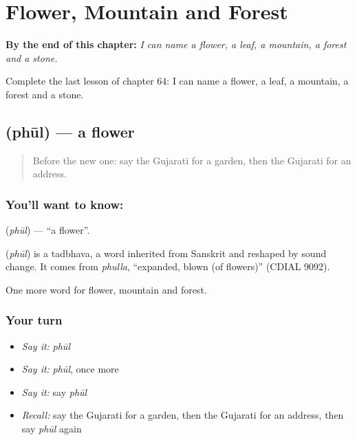 
\chapter{Flower, Mountain and Forest}
\label{ch:gu-flower-mountain-and-forest}

\begin{chapteropening}
\textbf{By the end of this chapter:} \emph{I can name a flower, a leaf, a mountain, a forest and a stone.}

Complete the last lesson of chapter 64: I can name a flower, a leaf, a mountain, a forest and a stone.
\end{chapteropening}

\section[\texorpdfstring{\gu{ફૂલ} (phūl)}{ફૂલ (phūl)}]{ (phūl) — a flower}

\label{lesson:GU-C64-flower}



\begin{quote}
Before the new one: say the Gujarati for a garden, then the Gujarati for an address.
\end{quote}

\subsection*{You'll want to know: }
\textbf{} (\emph{phūl}) — \textquotedblleft{}a flower\textquotedblright{}.

\begin{cousinweb}
\textbf{} (\emph{phūl}) is a tadbhava, a word inherited from Sanskrit and reshaped by sound change. It comes from \emph{phulla}, \textquotedblleft{}expanded, blown (of flowers)\textquotedblright{} (CDIAL 9092).
\end{cousinweb}

\begin{grammarlens}[title={What you've built}]
One more word for flower, mountain and forest.
\end{grammarlens}

\subsection*{Your turn}
\begin{itemize}
\raggedright
  \item \emph{Say it:} \emph{phūl}
  \item \emph{Say it:} \emph{phūl}, once more
  \item \emph{Say it:} say \emph{phūl}
  \item \emph{Recall:} say the Gujarati for a garden, then the Gujarati for an address, then say \emph{phūl} again
\end{itemize}

